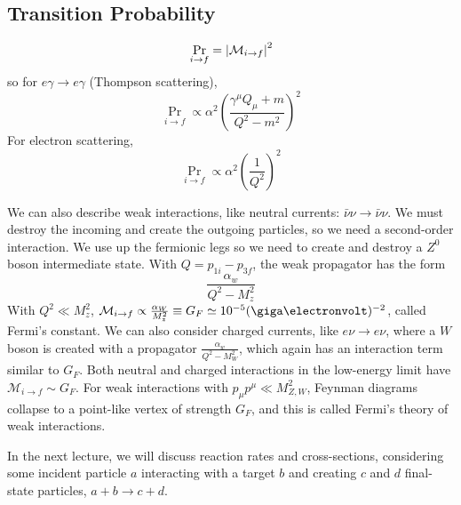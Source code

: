\documentclass[a4paper,twoside,master.tex]{subfiles}
\begin{document}
\subsection{Transition Probability}\label{sub:transition_probability}

\begin{equation}
    \Pr_{i \to f} = \abs{\mathcal{M}_{i \to f}}^2
\end{equation}
so for $ e \gamma \to e \gamma $ (Thompson scattering),
\begin{equation}
    \Pr_{i \to f} \propto \alpha^2 \left( \frac{\gamma^{\mu} Q_{\mu} + m}{Q^2 - m^2} \right)^2
\end{equation}
For electron scattering,
\begin{equation}
    \Pr_{i \to f} \propto \alpha^2 \left( \frac{1}{Q^2} \right)^2
\end{equation}

We can also describe weak interactions, like neutral currents: $ \bar{\nu} \nu \to \bar{\nu} \nu $. We must destroy the incoming and create the outgoing particles, so we need a second-order interaction. We use up the fermionic legs so we need to create and destroy a $ Z^0 $ boson intermediate state. With $ Q = p_{1i} - p_{3f} $, the weak propagator has the form
\begin{equation}
    \frac{\alpha_w}{Q^2 - M_z^2}
\end{equation}
With $ Q^2 \ll M_z^2 $, $ \mathcal{M}_{i \to f} \propto \frac{\alpha_W}{M_z^2} \equiv G_F \simeq 10^{-5} (\giga\electronvolt)^{-2} $, called Fermi's constant. We can also consider charged currents, like $ e \nu \to e \nu $, where a $ W $ boson is created with a propagator $ \frac{\alpha_w}{Q^2 - M_W^2} $, which again has an interaction term similar to $ G_F $. Both neutral and charged interactions in the low-energy limit have $ \mathcal{M}_{i \to f} \sim G_F $. For weak interactions with $ p_{\mu} p^{\mu} \ll M^2_{Z,W} $, Feynman diagrams collapse to a point-like vertex of strength $ G_F $, and this is called Fermi's theory of weak interactions.

In the next lecture, we will discuss reaction rates and cross-sections, considering some incident particle $ a $ interacting with a target $ b $ and creating $ c $ and $ d $ final-state particles, $ a + b \to c + d $.
\end{document}
